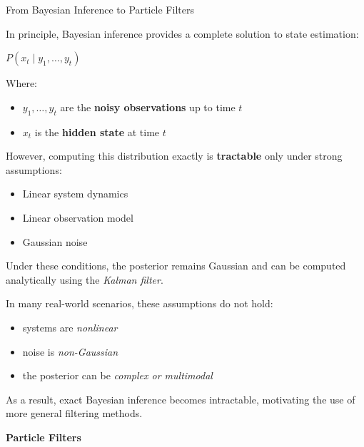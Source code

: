 \documentclass[aspectratio=169]{beamer}
\begin{document}
\begin{frame}{From Bayesian Inference to Particle Filters}

In principle, Bayesian inference provides a complete solution to state estimation:

\begin{center}
$P(x_t \mid y_1, \dots, y_t)$
\end{center}

Where:
\begin{itemize}
  \item $y_1, \dots, y_t$ are the \textbf{noisy observations} up to time $t$
  \item $x_t$ is the \textbf{hidden state} at time $t$
\end{itemize}

\vspace{0.5cm}

However, computing this distribution exactly is \textbf{tractable} only under strong assumptions:

\begin{itemize}
  \item Linear system dynamics
  \item Linear observation model
  \item Gaussian noise
\end{itemize}

\vspace{0.5cm}

Under these conditions, the posterior remains Gaussian and can be computed analytically using the \textit{Kalman filter}.

\vspace{0.6cm}

In many real-world scenarios, these assumptions do not hold:

\begin{itemize}
  \item systems are \textit{nonlinear}
  \item noise is \textit{non-Gaussian}
  \item the posterior can be \textit{complex or multimodal}
\end{itemize}

\vspace{0.6cm}

As a result, exact Bayesian inference becomes intractable, motivating the use of more general filtering methods.
\end{frame}

\begin{frame}[standout]
	\Huge\textbf{Particle Filters}
\end{frame}
\end{document}
